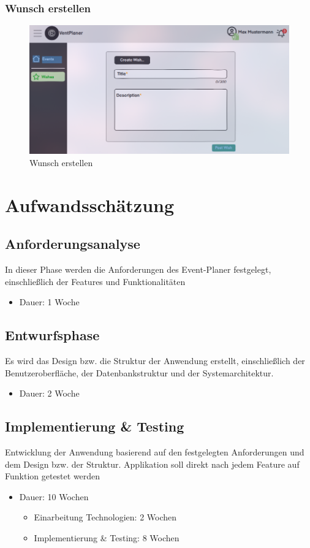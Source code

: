 \documentclass[a4paper,12pt]{article}
\begin{document}
\subsubsection{Wunsch erstellen}
\begin{figure}[H]
    \centering
    \includegraphics[width=1\textwidth]{Abbildungen/wishes/create_wish.png}
    \caption{Wunsch erstellen}
    \label{fig:create_wish}
  \end{figure}
\newpage
\section{Aufwandsschätzung}
\subsection{Anforderungsanalyse}
In dieser Phase werden die Anforderungen des Event-Planer festgelegt, einschließlich der Features und Funktionalitäten
\begin{itemize}
    \item Dauer: 1 Woche
\end{itemize}
\subsection{Entwurfsphase}
Es wird das Design bzw. die Struktur der Anwendung erstellt, einschließlich der Benutzeroberfläche, der Datenbankstruktur und der Systemarchitektur.
\begin{itemize}
    \item Dauer: 2 Woche
\end{itemize}
\subsection{Implementierung \& Testing}
Entwicklung der Anwendung basierend auf den festgelegten Anforderungen und dem Design bzw. der Struktur. Applikation soll direkt nach jedem Feature auf Funktion getestet werden
\begin{itemize}
    \item Dauer: 10 Wochen
    \begin{itemize}
        \item Einarbeitung Technologien: 2 Wochen
        \item Implementierung \& Testing: 8 Wochen
    \end{itemize}
\end{itemize}
\end{document}
